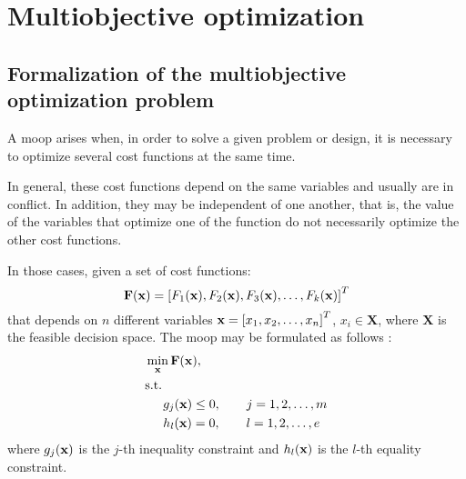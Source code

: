 \chapter{Multiobjective optimization}
\label{chap:Multi-objective}
{} 

\section{Formalization of the multiobjective optimization problem}
\label{sec:MOOPForm}
%
A \gls{moop} arises when, in order to solve a given problem or design, it is necessary to optimize several cost functions at the same time. 

In general, these cost functions depend on the same variables and usually are in conflict.  In addition, they may be independent of one another, that is, the value of the variables that optimize one of the function do not necessarily optimize the other cost functions.

In those cases, given a set of cost functions:
\begin{equation}
\mathbf{F}(\mathbf{x})=\left[F_1(\mathbf{x}), F_2(\mathbf{x}), F_3(\mathbf{x}), \ldots, F_k(\mathbf{x})\right]^T
\label{eq:functions}
\end{equation}
%
that depends on $n$ different variables $\mathbf{x}=\left[x_1, x_2, \ldots, x_n \right]^T$, $x_i \in \mathbf{X}$, where $\mathbf{X}$ is the feasible decision space. The \gls{moop} may be formulated as follows \citep{Marler2004}:%
%
\begin{subequations}%
	\begin{align}%
	&\min_\xv \mathbf{F}(\xv), \label{eq:Min01}\\ %
	&\text{s.t.}\nonumber\\%
	& \hspace{5mm} g_j(\xv) \leq 0, \qquad j=1,2,\ldots,m  \label{eq:Min02}\\ %
	& \hspace{5mm} h_l(\xv) = 0, \qquad l=1,2,\ldots,e  \label{eq:Min03}%
	\end{align}%
	\label{eq:OptProb}%
\end{subequations}%
%
where $g_j(\mathbf{x})$ is the $j$-th inequality constraint and $h_l(\mathbf{x})$ is the $l$-th equality constraint. 
%
